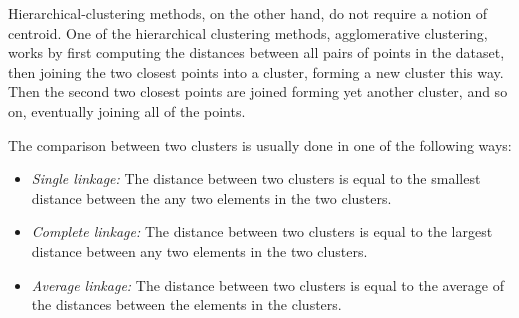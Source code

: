 \documentclass[parskip]{cs4rep}
\begin{document}
Hierarchical-clustering methods, on the other hand, do not require a notion of centroid. One of the hierarchical clustering methods, agglomerative clustering, works by first computing the distances between all pairs of points in the dataset, then joining the two closest points into a cluster, forming a new cluster this way. Then the second two closest points are joined forming yet another cluster, and so on, eventually joining all of the points. 

The comparison between two clusters is usually done in one of the following ways:

\begin{itemize}
   \item \emph{Single linkage:} The distance between two clusters is equal to the smallest distance between the any two elements in the two clusters.
   \item \emph{Complete linkage:} The distance between two clusters is equal to the largest distance between any two elements in the two clusters.
   \item \emph{Average linkage:} The distance between two clusters is equal to the average of the distances between the elements in the clusters.
\end{itemize}
\end{document}
